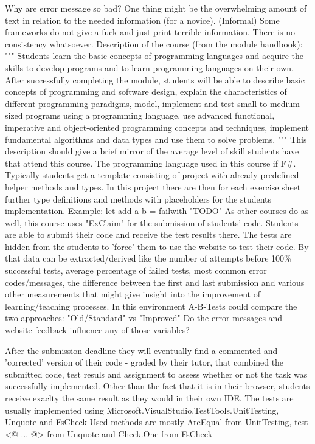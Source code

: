\documentclass[
	bibliography=totoc,
	listof=totoc,
]{scrbook}
\begin{document}
\begin{justify}
Why are error message so bad? One thing might be the overwhelming amount of text in relation to the needed information (for a novice).
(Informal) Some frameworks do not give a fuck and just print terrible information. There is no consistency whatsoever.
Description of the course (from the module handbook):
"""
    Students learn the basic concepts of programming languages and acquire the skills to develop programs and to learn programming languages on their own.
    After successfully completing the module, students will be able to describe basic concepts of programming and software design,
    explain the characteristics of different programming paradigms, model, implement and test small to medium-sized programs using a programming language,
    use advanced functional, imperative and object-oriented programming concepts and techniques, implement fundamental algorithms and data types and use them to solve problems.
"""
This description should give a brief mirror of the average level of skill students have that attend this course.
The programming language used in this course if F\#.
Typically students get a template consisting of project with already predefined helper methods and types.
In this project there are then for each exercise sheet further type definitions and methods with placeholders for the students implementation.
Example: let add a b = failwith "TODO"
As other courses do as well, this course uses "ExClaim" for the submission of students' code.
Students are able to submit their code and receive the test results there.
The tests are hidden from the students to 'force' them to use the website to test their code.
By that data can be extracted/derived like the number of attempts before 100\% successful tests, average percentage of failed tests, most common error codes/messages,
the difference between the first and last submission and various other measurements that might give insight into the improvement of learning/teaching processes.
In this environment A-B-Tests could compare the two approaches: "Old/Standard" vs "Improved"
Do the error messages and website feedback influence any of those variables?

After the submission deadline they will eventually find a commented and 'corrected' version of their code - graded by their tutor, that combined the submitted code, test resuls and assignment
to assess whether or not the task was successfully implemented.
Other than the fact that it is in their browser, students receive exaclty the same result as they would in their own IDE.
The tests are usually implemented using Microsoft.VisualStudio.TestTools.UnitTesting, Unquote and FsCheck
Used methods are mostly AreEqual from UnitTesting, test <@ ... @> from Unquote and Check.One from FsCheck


\end{justify}
\end{document}
